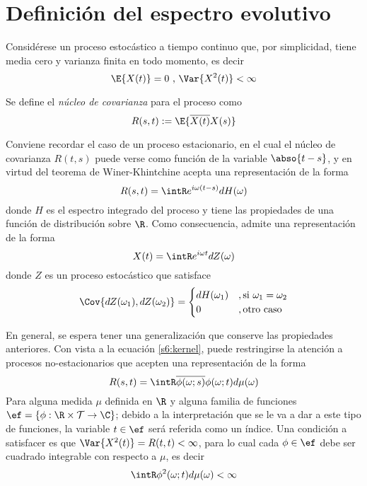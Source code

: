 
\section{Definición del espectro evolutivo}
\label{sec:espectro}

Considérese un proceso estocástico
a tiempo continuo \xtin{\R} que, por simplicidad, tiene media cero y varianza finita en todo 
momento, es decir
\begin{equation*}
\E{X(t)} = 0 \text{  ,  } \Var{X^{2}(t)} < \infty
\end{equation*}

Se define el \textit{núcleo de covarianza} para el proceso como
\begin{equation}
R(s,t) := \E{\overline{X(t)}X(s)}
\end{equation}

Conviene recordar el caso de un proceso estacionario, en el cual el núcleo de covarianza $R(t,s)$ 
puede verse como función de la variable $\abso{t-s}$, y en virtud del teorema de Winer-Khintchine 
acepta una representación de la forma
%
\begin{equation}
R(s,t) = \intR e^{i \omega (t-s)} dH(\omega)
\label{s6:kernel}
\end{equation}
%
donde $H$ es el espectro integrado del proceso y tiene las propiedades de una función de 
distribución sobre $\R$.
%
Como consecuencia, \xtin{\R} admite una representación de la forma
\begin{equation}
X(t) = \intR e^{i\omega t} dZ(\omega)
\end{equation}
%
donde $Z$ es un proceso estocástico que satisface
\begin{equation}
\Cov{dZ(\omega_1),dZ(\omega_2)} = 
\begin{cases}
dH(\omega_1) &, \text{si } \omega_1 = \omega_2 \\
0 &, \text{otro caso}
\end{cases}
\end{equation}

En general, se espera tener una generalización que conserve las propiedades anteriores. Con vista
a la ecuación \ref{s6:kernel}, puede restringirse la atención a procesos no-estacionarios que
acepten una representación de la forma
\begin{equation}
R(s,t) = \intR \overline{\phi(\omega;s)}\phi(\omega;t) d\mu(\omega)
\label{s6:erre}
\end{equation}
%
Para alguna medida $\mu$ definida en $\R$ y alguna familia de funciones 
$\ef = \left\{ \phi: \R \times \mathcal{T} \rightarrow \C \right\}$; debido a la interpretación que 
se le va a dar a este tipo de funciones, la variable $t\in \ef$ será referida como un índice.
%
Una condición a satisfacer es que $\Var{X^{2}(t)} = R(t,t) < \infty$, para lo cual cada 
$\phi \in \ef$ debe ser cuadrado integrable con respecto a $\mu$, es decir
\begin{equation}
\intR \phi^{2}(\omega;t) d\mu(\omega) < \infty
\end{equation}


